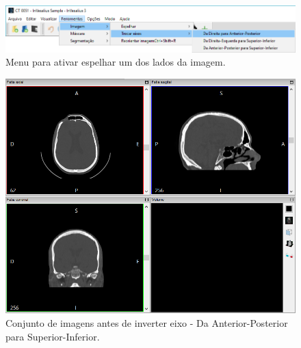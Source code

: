 \begin{figure}[!htb]
\centering
\includegraphics[scale=0.4]{../user_guide_figures/invesalius_screen/menu_invert_axis_pt.png}
\caption{Menu para ativar espelhar um dos lados da imagem.}
\label{fig:menu_invert_axis}
\end{figure}

\begin{figure}[!htbp]
\centering
\includegraphics[scale=0.4]{../user_guide_figures/invesalius_screen/invert_axis_axial_pt.png}
\caption{Conjunto de imagens antes de inverter eixo - Da Anterior-Posterior para Superior-Inferior.}
\label{fig:invert_axis_axial}
\end{figure}

